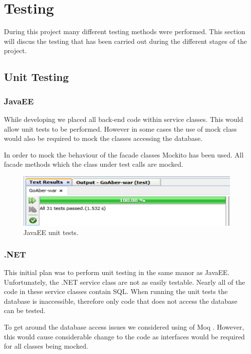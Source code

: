 \chapter{Testing}

During this project many different testing methods were performed. This section will discus the testing that has been carried out during the different stages of the project.

\section{Unit Testing}

\subsection{JavaEE}
While developing we placed all back-end code within service classes. This would allow unit tests to be performed. However in some cases the use of mock class would also be required to mock the classes accessing the database. 
	
In order to mock the behaviour of the facade classes Mockito\cite{Mockito} has been used. All facade methods which the class under test calls are mocked. 

\begin{figure}[H]
\begin{center}
\includegraphics[scale=0.6]{images/testing/UnitTestsJavaEE.png} 
\caption{JavaEE unit tests.}
\label{fig:testing_vsBuild}
\end{center}
\end{figure}

\subsection{.NET}
This initial plan was to perform unit testing in the same manor as JavaEE. Unfortunately, the .NET service class are not as easily testable. Nearly all of the code in these service classes contain SQL. When running the unit tests the database is inaccessible, therefore only code that does not access the database can be tested. 

To get around the database access issues we considered using of Moq \cite{Moq}. However, this would cause considerable change to the code as interfaces would be required for all classes being mocked. 

